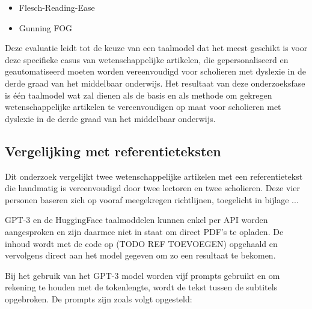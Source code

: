 \begin{itemize}
	\item Flesch-Reading-Ease
	\item Gunning FOG
\end{itemize}

Deze evaluatie leidt tot de keuze van een taalmodel dat het meest geschikt is voor deze specifieke casus van wetenschappelijke artikelen, die gepersonaliseerd en geautomatiseerd moeten worden vereenvoudigd voor scholieren met dyslexie in de derde graad van het middelbaar onderwijs. Het resultaat van deze onderzoeksfase is één taalmodel wat zal dienen als de basis en als methode om gekregen wetenschappelijke artikelen te vereenvoudigen op maat voor scholieren met dyslexie in de derde graad van het middelbaar onderwijs.

\subsection{Vergelijking met referentieteksten}

Dit onderzoek vergelijkt twee wetenschappelijke artikelen met een referentietekst die handmatig is vereenvoudigd door twee lectoren en twee scholieren. Deze vier personen baseren zich op vooraf meegekregen richtlijnen, toegelicht in bijlage ...

\medspace

GPT-3 en de HuggingFace taalmoddelen kunnen enkel per API worden aangesproken en zijn daarmee niet in staat om direct PDF's te opladen. De inhoud wordt met de code op (TODO REF TOEVOEGEN) opgehaald en vervolgens direct aan het model gegeven om zo een resultaat te bekomen. 


\medspace

Bij het gebruik van het GPT-3 model worden vijf prompts gebruikt en om rekening te houden met de tokenlengte, wordt de tekst tussen de subtitels opgebroken. De prompts zijn zoals volgt opgesteld:

